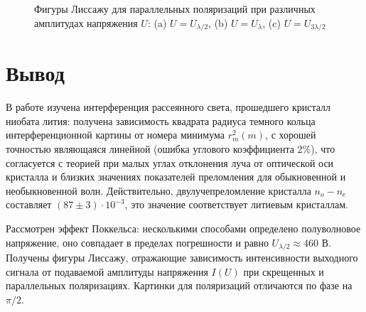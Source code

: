 \begin{figure}[h]
\begin{minipage}[h]{0.3\linewidth}
		\end{minipage}
		\hfill
		\begin{minipage}[h]{0.3\linewidth}
		\end{minipage}
		\caption{Фигуры Лиссажу для параллельных поляризаций при различных амплитудах напряжения $U$: (a) $U = U_{\lambda/2}$, (b) $U = U_{\lambda}$, (c) $U = U_{3\lambda/2}$ }
		\label{lis}
	\end{figure}

	
	\newpage
	\section{Вывод}
	
	В работе изучена интерференция рассеянного света, прошедшего кристалл ниобата лития: получена зависимость квадрата радиуса темного кольца интерференционной картины от номера минимума $r_m^2(m)$, с хорошей точностью являющаяся линейной (ошибка углового коэффициента 2\%), что согласуется с теорией при малых углах отклонения луча от оптической оси кристалла и близких значениях показателей преломления для обыкновенной и необыкновенной волн. Действительно, двулучепреломление кристалла $n_o - n_e$ составляет $(87 \pm 3)\cdot10^{-3}$, это значение соответствует литиевым кристаллам. 
	
	Рассмотрен эффект Поккельса: несколькими способами определено полуволновое напряжение, оно совпадает в пределах погрешности и равно $U_{\lambda/2} \approx 460$ В. Получены фигуры Лиссажу, отражающие зависимость интенсивности выходного сигнала от подаваемой амплитуды напряжения $I(U)$ при скрещенных и параллельных поляризациях. Картинки для поляризаций отличаются по фазе на $\pi/2$.
	
	\




